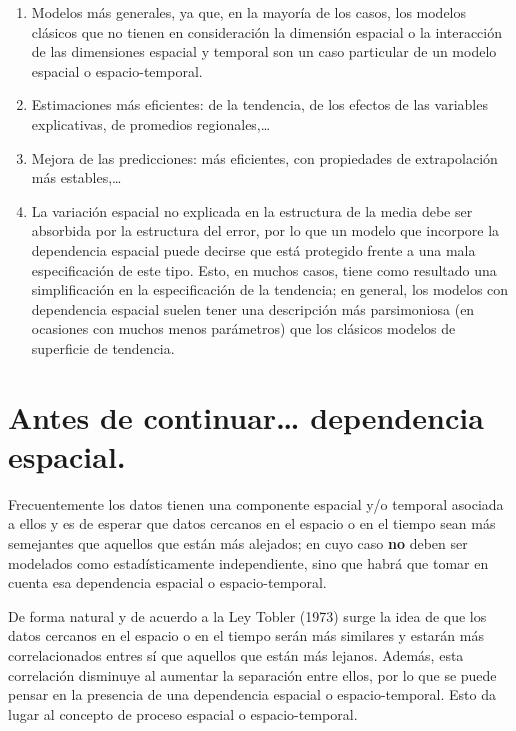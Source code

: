 \documentclass[
]{report}
\begin{document}
\begin{enumerate}
\def\labelenumi{\arabic{enumi}.}
\item
  Modelos más generales, ya que, en la mayoría de los casos, los modelos
  clásicos que no tienen en consideración la dimensión espacial o la
  interacción de las dimensiones espacial y temporal son un caso particular de
  un modelo espacial o espacio-temporal.
\item
  Estimaciones más eficientes: de la tendencia, de los efectos de las
  variables explicativas, de promedios regionales,\ldots{}
\item
  Mejora de las predicciones: más eficientes, con propiedades de extrapolación
  más estables,\ldots{}
\item
  La variación espacial no explicada en la estructura de la media debe ser
  absorbida por la estructura del error, por lo que un modelo que incorpore la
  dependencia espacial puede decirse que está protegido frente a una mala
  especificación de este tipo. Esto, en muchos casos, tiene como resultado una
  simplificación en la especificación de la tendencia; en general, los modelos
  con dependencia espacial suelen tener una descripción más parsimoniosa (en
  ocasiones con muchos menos parámetros) que los clásicos modelos de
  superficie de tendencia.
\end{enumerate}

\hypertarget{antes-de-continuar-dependencia-espacial.}{%
\section{Antes de continuar\ldots{} dependencia espacial.}\label{antes-de-continuar-dependencia-espacial.}}

Frecuentemente los datos tienen una componente espacial y/o temporal asociada a
ellos y es de esperar que datos cercanos en el espacio o en el tiempo sean más
semejantes que aquellos que están más alejados; en cuyo caso \textbf{no} deben ser
modelados como estadísticamente independiente, sino que habrá que tomar en
cuenta esa dependencia espacial o espacio-temporal.

De forma natural y de acuerdo a la Ley Tobler (1973) surge la idea de que los
datos cercanos en el espacio o en el tiempo serán más similares y estarán más
correlacionados entres sí que aquellos que están más lejanos. Además, esta
correlación disminuye al aumentar la separación entre ellos, por lo que se puede
pensar en la presencia de una dependencia espacial o espacio-temporal. Esto da
lugar al concepto de proceso espacial o espacio-temporal.
\end{document}
